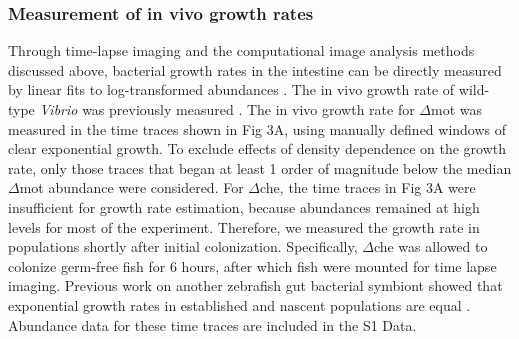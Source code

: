 \subsubsection{Measurement of in vivo growth rates}
Through time-lapse imaging and the computational image analysis methods discussed above, bacterial growth rates in the intestine can be directly measured by linear fits to log-transformed abundances \cite{wiles_host_2016,schlomann_sublethal_2019,jemielita_spatial_2014}. The in vivo growth rate of wild-type \textit{Vibrio} was previously measured \cite{wiles_host_2016}. The in vivo growth rate for $\Delta$mot was measured in the time traces shown in Fig 3A, using manually defined windows of clear exponential growth. To exclude effects of density dependence on the growth rate, only those traces that began at least 1 order of magnitude below the median $\Delta$mot abundance were considered. For $\Delta$che, the time traces in Fig 3A were insufficient for growth rate estimation, because abundances remained at high levels for most of the experiment. Therefore, we measured the growth rate in populations shortly after initial colonization. Specifically, $\Delta$che was allowed to colonize germ-free fish for 6 hours, after which fish were mounted for time lapse imaging. Previous work on another zebrafish gut bacterial symbiont showed that exponential growth rates in established and nascent populations are equal \cite{wiles_host_2016}. Abundance data for these time traces are included in the S1 Data.

